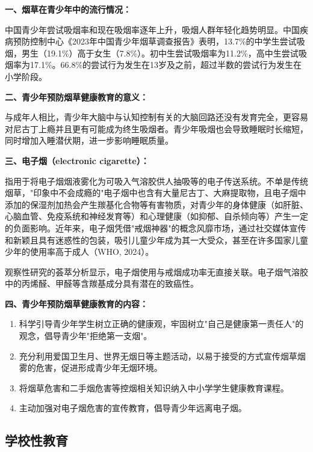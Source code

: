 \begin{keybox}
\textbf{一、烟草在青少年中的流行情况：}

中国青少年尝试吸烟率和现在吸烟率逐年上升，吸烟人群年轻化趋势明显。中国疾病预防控制中心《2023年中国青少年烟草调查报告》表明，13.7\%的中学生尝试吸烟，男生（19.1\%）高于女生（7.8\%）。初中生尝试吸烟率为11.2\%，高中生尝试吸烟率为17.1\%。66.8\%的尝试行为发生在13岁及之前，超过半数的尝试行为发生在小学阶段。

\textbf{二、青少年预防烟草健康教育的意义：}

与成年人相比，青少年大脑中与认知控制有关的大脑回路还没有发育完全，更容易对尼古丁上瘾并且更有可能成为终生吸烟者。青少年吸烟也会导致睡眠时长缩短，同时增加入睡潜伏期，进一步影响睡眠质量。

\textbf{三、电子烟（electronic cigarette）：}

指用于将电子烟烟液雾化为可吸入气溶胶供人抽吸等的电子传送系统。不单是传统烟草，"印象中不会成瘾的"电子烟中也含有大量尼古丁、大麻提取物，且电子烟中添加的保湿剂加热会产生羰基化合物等有害物质，对青少年的身体健康（如肝脏、心脑血管、免疫系统和神经发育等）和心理健康（如抑郁、自杀倾向等）产生一定的负面影响。近年来，电子烟凭借"戒烟神器"的概念风靡市场，通过社交媒体宣传和新颖且具有迷惑性的包装，吸引儿童少年成为其一大受众，甚至在许多国家儿童少年的使用率高于成人（WHO, 2024）。

观察性研究的荟萃分析显示，电子烟使用与戒烟成功率无直接关联。电子烟气溶胶中的丙烯醛、甲醛等含羰基成分具有潜在的致癌性。

\textbf{四、青少年预防烟草健康教育的内容：}
\begin{enumerate}[leftmargin=*]
    \item 科学引导青少年学生树立正确的健康观，牢固树立"自己是健康第一责任人"的观念，倡导青少年"拒绝第一支烟"。
    \item 充分利用爱国卫生月、世界无烟日等主题活动，以易于接受的方式宣传烟草烟雾的危害，促进形成青少年无烟环境。
    \item 将烟草危害和二手烟危害等控烟相关知识纳入中小学学生健康教育课程。
    \item 主动加强对电子烟危害的宣传教育，倡导青少年远离电子烟。
\end{enumerate}
\end{keybox}

\subsection{学校性教育}

